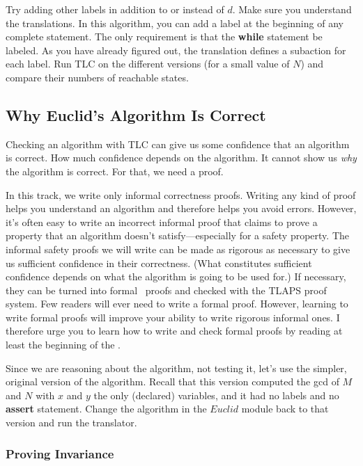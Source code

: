 Try adding other labels in addition to or instead of $d$.  Make
sure you understand the translations.  In this algorithm, you can add
a label at the beginning of any complete statement.  The only
requirement is that the \textbf{while} statement be labeled.  As you
have already figured out, the translation defines a subaction for each
label.  Run TLC on the different versions (for a small value of $N$)
and compare their numbers of reachable states.

\subsection{Why Euclid's Algorithm Is Correct} 

Checking an algorithm with TLC can give us some confidence that an
algorithm is correct.  How much confidence depends on the algorithm.
It cannot show us \emph{why} the algorithm is correct.  For that, we
need a proof.

In this track, we write only informal correctness proofs.  Writing any
kind of proof helps you understand an algorithm and therefore helps
you avoid errors.  However, it's often easy to write an incorrect
informal proof that claims to prove a property that an algorithm
doesn't satisfy---especially for a safety property.  The informal
safety proofs we will write can be made as rigorous as necessary to
give us sufficient confidence in their correctness.  (What constitutes
sufficient confidence depends on what the algorithm is going to be
used for.)  If necessary, they can be turned into formal \tlaplus\
proofs and checked with the
TLAPS proof system.  Few readers will ever need to write a formal
proof.  However, learning to write formal proofs will improve your
ability to write rigorous informal ones.  I therefore urge you
to learn how to write and check formal proofs by reading at least the
beginning of the 
 .

Since we are reasoning about the algorithm, not testing it, let's use
the simpler, original version of the algorithm.  Recall that this
version computed the gcd of $M$ and $N$ with $x$ and $y$ the only
(declared) variables, and it had no labels and no \textbf{assert}
statement.  Change the algorithm in the $Euclid$ module back to that
version and run the translator.

\subsubsection{Proving Invariance}  

